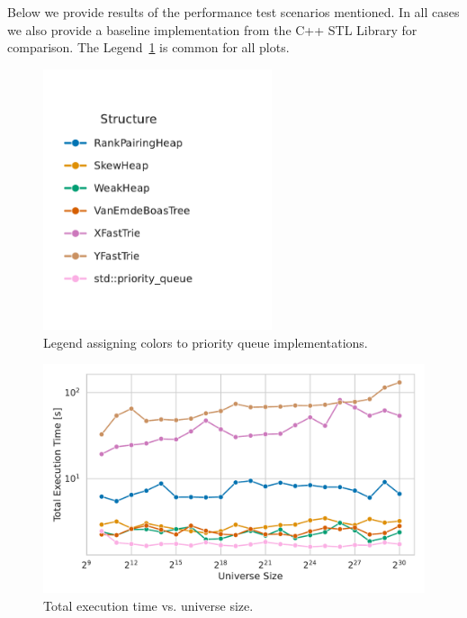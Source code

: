 Below we provide results of the performance test scenarios mentioned. In all cases we also provide a baseline implementation from the C++ STL Library for comparison. The Legend~\ref{fig:structure_legend} is common for all plots.

\begin{figure}[H]
    \centering
    \includegraphics[width=0.6\textwidth]{figures/plots/legend.pdf}
    \caption{Legend assigning colors to priority queue implementations.}
    \label{fig:structure_legend}
\end{figure}

\begin{figure}[H]
    \centering
    \includegraphics[width=1.0\textwidth]{figures/plots/plot_universe_vs_time.pdf}
    \caption{Total execution time vs. universe size.}
    \label{fig:Xfast_Yfast_performance}
\end{figure}

